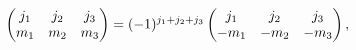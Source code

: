\[\begin{pmatrix}j_{1}&j_{2}&j_{3}\\
m_{1}&m_{2}&m_{3}\end{pmatrix}=(-1)^{j_{1}+j_{2}+j_{3}}\begin{pmatrix}j_{1}&j_%
{2}&j_{3}\\
-m_{1}&-m_{2}&-m_{3}\end{pmatrix},\]
